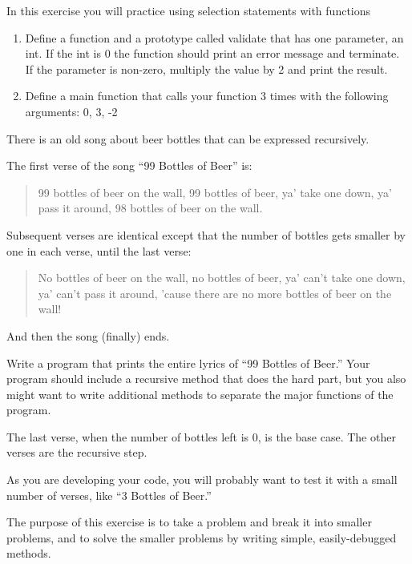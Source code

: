 \begin{exercise}
	In this exercise you will practice using selection statements with functions
	\begin{enumerate}
		\item Define a function and a prototype called validate that has one parameter, an int. 
		If the int is 0 the function should print an error message and terminate. 
		If the parameter is non-zero, multiply the value by 2 and print the result.
		
		\item 
		Define a main function that calls your function 3 times with the following arguments: 0, 3, -2
		
	\end{enumerate}

\end{exercise}


\begin{exercise}
There is an old song about 
beer bottles that can be expressed recursively.

The first verse of the song ``99 Bottles of Beer'' is:

\begin{quote}
99 bottles of beer on the wall,
99 bottles of beer,
ya' take one down, ya' pass it around,
98 bottles of beer on the wall.
\end{quote}

Subsequent verses are identical except that the number
of bottles gets smaller by one in each verse, until the
last verse:

\begin{quote}
No bottles of beer on the wall,
no bottles of beer,
ya' can't take one down, ya' can't pass it around,
'cause there are no more bottles of beer on the wall!
\end{quote}
%
And then the song (finally) ends.

Write a program that prints the entire lyrics of
``99 Bottles of Beer.''  Your program should include a
recursive method that does the hard part, but you also
might want to write additional methods to separate the major
functions of the program.

The last verse, when the number of bottles left is 0, is the base case. 
The other verses are the recursive step. 

As you are developing your code, you will probably
want to test it with a small number of verses, like
``3 Bottles of Beer.''

The purpose of this exercise is to take a problem and break it
into smaller problems, and to solve the smaller problems by writing
simple, easily-debugged methods.
\end{exercise}


